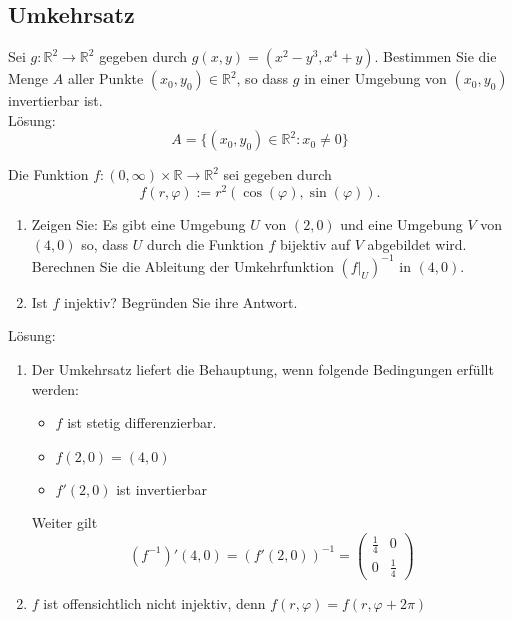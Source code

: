 \documentclass[parskip=full]{scrartcl}
\begin{document}
\subsection{Umkehrsatz}
Sei $g : \mathbb{R}^2 \to \mathbb{R}^2$ gegeben durch $g(x,y) = (x^2 - y^3, x^4 + y)$.
Bestimmen Sie die Menge $A$ aller Punkte $(x_0, y_0) \in \mathbb{R}^2$, so dass $g$ in einer Umgebung von $(x_0, y_0)$ invertierbar ist.\\
Lösung:
\begin{displaymath}
  A = \{(x_0, y_0) \in \mathbb{R}^2 : x_0 \neq 0\}
\end{displaymath}

Die Funktion $f : (0, \infty) \times \mathbb{R} \to \mathbb{R}^2$ sei gegeben durch
\begin{displaymath}
  f(r, \varphi) := r^2 (\cos(\varphi), \sin(\varphi)).
\end{displaymath}
\begin{enumerate}
    \item Zeigen Sie:
    Es gibt eine Umgebung $U$ von $(2,0)$ und eine Umgebung $V$ von $(4,0)$ so, dass $U$ durch die Funktion $f$ bijektiv auf $V$ abgebildet wird.
    Berechnen Sie die Ableitung der Umkehrfunktion $(f|_U)^{-1}$ in $(4,0)$.
    \item Ist $f$ injektiv?
    Begründen Sie ihre Antwort.
\end{enumerate}
Lösung:
\begin{enumerate}
    \item Der Umkehrsatz liefert die Behauptung, wenn folgende Bedingungen erfüllt werden:
    \begin{itemize}
        \item $f$ ist stetig differenzierbar.
        \item $f(2,0) = (4,0)$
        \item $f'(2,0)$ ist invertierbar
    \end{itemize}
    Weiter gilt
    \begin{displaymath}
      (f^{-1})'(4,0) = (f'(2,0))^{-1} = 
      \begin{pmatrix}
        \frac{1}{4} & 0\\
        0 & \frac{1}{4}
      \end{pmatrix}
    \end{displaymath}
    \item $f$ ist offensichtlich nicht injektiv, denn $f(r, \varphi) = f(r, \varphi + 2\pi)$
\end{enumerate}
\end{document}

